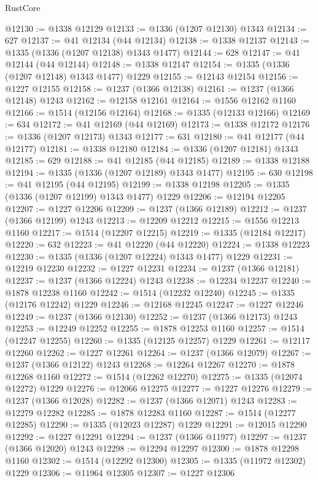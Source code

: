 \begin{lexlean}{RustCore}
\begin{coremodule}
@12130 := @1338 @12129
@12133 := @1336 (@1207 @12130) @1343
@12134 := 627
@12137 := @41 @12134 (@44 @12134)
@12138 := @1338 @12137
@12143 := @1335 (@1336 (@1207 @12138) @1343 @1477)
@12144 := 628
@12147 := @41 @12144 (@44 @12144)
@12148 := @1338 @12147
@12154 := @1335 (@1336 (@1207 @12148) @1343 @1477) @1229
@12155 := @12143 @12154
@12156 := @1227 @12155
@12158 := @1237 (@1366 @12138)
@12161 := @1237 (@1366 @12148) @1243
@12162 := @12158 @12161
@12164 := @1556 @12162 @1160
@12166 := @1514 (@12156 @12164)
@12168 := @1335 (@12133 @12166)
@12169 := 634
@12172 := @41 @12169 (@44 @12169)
@12173 := @1338 @12172
@12176 := @1336 (@1207 @12173) @1343
@12177 := 631
@12180 := @41 @12177 (@44 @12177)
@12181 := @1338 @12180
@12184 := @1336 (@1207 @12181) @1343
@12185 := 629
@12188 := @41 @12185 (@44 @12185)
@12189 := @1338 @12188
@12194 := @1335 (@1336 (@1207 @12189) @1343 @1477)
@12195 := 630
@12198 := @41 @12195 (@44 @12195)
@12199 := @1338 @12198
@12205 := @1335 (@1336 (@1207 @12199) @1343 @1477) @1229
@12206 := @12194 @12205
@12207 := @1227 @12206
@12209 := @1237 (@1366 @12189)
@12212 := @1237 (@1366 @12199) @1243
@12213 := @12209 @12212
@12215 := @1556 @12213 @1160
@12217 := @1514 (@12207 @12215)
@12219 := @1335 (@12184 @12217)
@12220 := 632
@12223 := @41 @12220 (@44 @12220)
@12224 := @1338 @12223
@12230 := @1335 (@1336 (@1207 @12224) @1343 @1477) @1229
@12231 := @12219 @12230
@12232 := @1227 @12231
@12234 := @1237 (@1366 @12181)
@12237 := @1237 (@1366 @12224) @1243
@12238 := @12234 @12237
@12240 := @1878 @12238 @1160
@12242 := @1514 (@12232 @12240)
@12245 := @1335 (@12176 @12242) @1229
@12246 := @12168 @12245
@12247 := @1227 @12246
@12249 := @1237 (@1366 @12130)
@12252 := @1237 (@1366 @12173) @1243
@12253 := @12249 @12252
@12255 := @1878 @12253 @1160
@12257 := @1514 (@12247 @12255)
@12260 := @1335 (@12125 @12257) @1229
@12261 := @12117 @12260
@12262 := @1227 @12261
@12264 := @1237 (@1366 @12079)
@12267 := @1237 (@1366 @12122) @1243
@12268 := @12264 @12267
@12270 := @1878 @12268 @1160
@12272 := @1514 (@12262 @12270)
@12275 := @1335 (@12074 @12272) @1229
@12276 := @12066 @12275
@12277 := @1227 @12276
@12279 := @1237 (@1366 @12028)
@12282 := @1237 (@1366 @12071) @1243
@12283 := @12279 @12282
@12285 := @1878 @12283 @1160
@12287 := @1514 (@12277 @12285)
@12290 := @1335 (@12023 @12287) @1229
@12291 := @12015 @12290
@12292 := @1227 @12291
@12294 := @1237 (@1366 @11977)
@12297 := @1237 (@1366 @12020) @1243
@12298 := @12294 @12297
@12300 := @1878 @12298 @1160
@12302 := @1514 (@12292 @12300)
@12305 := @1335 (@11972 @12302) @1229
@12306 := @11964 @12305
@12307 := @1227 @12306

\end{coremodule}
\end{lexlean}
